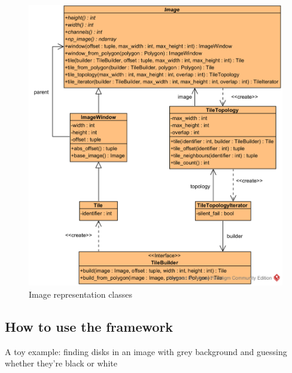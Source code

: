 \begin{figure}[h]
	\center 
	\includegraphics[scale=0.9]{image/uml_image_package.png}
	\caption{Image representation classes}
	\label{fig:uml_image_package}
\end{figure}

\subsection{How to use the framework}
A toy example: finding disks in an image with grey background and guessing whether they're black or white 